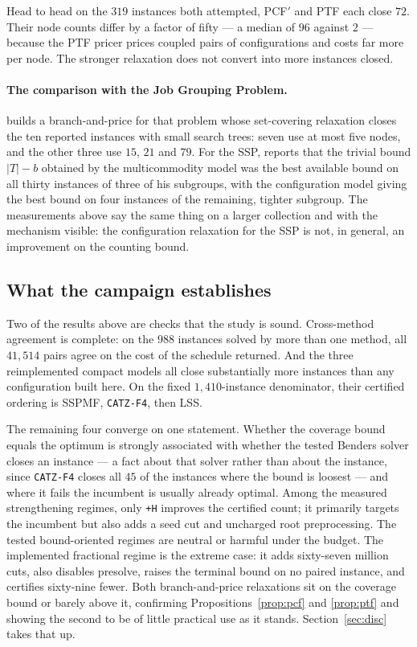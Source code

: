 Head to head on the $319$ instances both attempted, PCF$'$ and PTF each close $72$.
Their node counts differ by a factor of fifty --- a median of $96$ against $2$ ---
because the PTF pricer prices coupled pairs of configurations and costs far more per
node. The stronger relaxation does not convert into more instances closed.

\paragraph{The comparison with the Job Grouping Problem.}
\citet{Otiai2026} builds a branch-and-price for that problem whose set-covering
relaxation closes the ten reported instances with small search trees: seven use at most
five nodes, and the other three use $15$, $21$ and $79$. For the
SSP, \citet{Moreira2026} reports that the trivial bound $\lvert T\rvert-b$ obtained by
the multicommodity model was the best available bound on all thirty instances of three
of his subgroups, with the configuration model giving the best bound on four instances
of the remaining, tighter subgroup. The measurements above say the same thing on a
larger collection and with the mechanism visible: the configuration relaxation for the
SSP is not, in general, an improvement on the counting bound.

\subsection{What the campaign establishes}\label{ssec:results-summary}

Two of the results above are checks that the study is sound. Cross-method agreement is
complete: on the $988$ instances solved by more than one method, all $41{,}514$ pairs
agree on the cost of the schedule returned. And the three reimplemented compact models
all close substantially more instances than any configuration built here. On the fixed
$1{,}410$-instance denominator, their certified ordering is SSPMF,
\texttt{CATZ-F4}, then LSS.

The remaining four converge on one statement. Whether the coverage bound equals the
optimum is strongly associated with whether the tested Benders solver closes an instance ---
a fact about that solver rather than about the instance, since \texttt{CATZ-F4} closes
all $45$ of the instances where the bound is loosest --- and where it fails the
incumbent is usually already optimal. Among the measured strengthening regimes, only
\texttt{+H} improves the certified count; it primarily targets the incumbent but also
adds a seed cut and uncharged root preprocessing. The tested bound-oriented regimes
are neutral or harmful under the budget. The implemented fractional regime is the
extreme case: it adds sixty-seven million cuts, also disables presolve, raises the
terminal bound on no paired instance, and certifies sixty-nine fewer. Both branch-and-price
relaxations sit on the coverage bound or barely above it, confirming
Propositions~\ref{prop:pcf} and \ref{prop:ptf} and showing the second to be of little
practical use as it stands. Section~\ref{sec:disc} takes that up.
